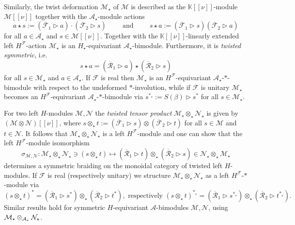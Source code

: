 \documentclass[a4paper,11pt]{article}
\begin{document}
Similarly, the twist deformation $\mathcal{M}_\star$ of $\mathcal{M}$ is described as
the $\mathbb{K}[[\nu]]$-module $\mathcal{M}[[\nu]]$ together with the $\mathcal{A}_\star$-module actions
\begin{equation}
    a\star s:=(\overline{\mathcal{F}}_1\rhd a)\cdot(\overline{\mathcal{F}}_2\rhd s)
    \hspace{1cm}\text{and}\hspace{1cm}
    s\star a:=(\overline{\mathcal{F}}_1\rhd s)(\overline{\mathcal{F}}_2\rhd a)
\end{equation}
for all $a\in\mathcal{A}_\star$ and $s\in\mathcal{M}[[\nu]]$. Together with the
$\mathbb{K}[[\nu]]$-linearly extended left $H^\mathcal{F}$-action $\mathcal{M}_\star$
is an $H_\star$-equivariant $\mathcal{A}_\star$-bimodule. Furthermore, it is
\textit{twisted symmetric}, i.e.
\begin{equation}\label{eq11}
    s\star a=(\overline{\mathcal{R}}_1\rhd a)\star(\overline{\mathcal{R}}_2\rhd s)
\end{equation}
for all $s\in\mathcal{M}_\star$ and $a\in\mathcal{A}_\star$.
If $\mathcal{F}$ is real then 
$\mathcal{M}_\star$ is an $H^\mathcal{F}$-equivariant $\mathcal{A}_\star$-$*$-bimodule
with respect to the
undeformed $*$-involution, while
if $\mathcal{F}$ is unitary $\mathcal{M}_\star$ becomes an 
$H^\mathcal{F}$-equivariant $\mathcal{A}_\star$-$*$-bimodule 
via $s^{*_\star}:=S(\beta)\rhd s^*$ for all $s\in\mathcal{M}_\star$.

For two left $H$-modules $\mathcal{M},\mathcal{N}$ the \textit{twisted tensor product}
$\mathcal{M}_\star\otimes_\star\mathcal{N}_\star$ is given by $(\mathcal{M}\otimes\mathcal{N})[[\nu]]$, where
$s\otimes_\star t:=(\overline{\mathcal{F}}_1\rhd s)
\otimes(\overline{\mathcal{F}}_2\rhd t)$ for all $s\in\mathcal{M}$ and $t\in\mathcal{N}$.
It follows that $\mathcal{M}_\star\otimes_\star\mathcal{N}_\star$ is a left $H^\mathcal{F}$-module
and one can show that the left $H^\mathcal{F}$-module isomorphism
\begin{equation}
    \sigma_{\mathcal{M},\mathcal{N}}\colon\mathcal{M}_\star\otimes_\star\mathcal{N}_\star\ni(s\otimes_\star t)\mapsto
    (\overline{\mathcal{R}}_1\rhd t)\otimes_\star(\overline{\mathcal{R}}_2\rhd s)\in \mathcal{N}_\star\otimes_\star\mathcal{M}_\star
\end{equation}
determines a symmetric braiding on the monoidal category of twisted left $H$-modules.
If $\mathcal{F}$ is real (respectively unitary) we structure
$\mathcal{M}_\star\otimes_\star\mathcal{N}_\star$ as a
left $H^\mathcal{F}$-$*$-module via
\begin{equation}
    (s\otimes_\star t)^*=(\overline{\mathcal{R}}_1\rhd s^*)\otimes_\star
    (\overline{\mathcal{R}}_2\rhd t^*),
    \text{ respectively }
    (s\otimes_\star t)^{*_\star}=(\overline{\mathcal{R}}_1\rhd s^{*_\star})\otimes_\star
    (\overline{\mathcal{R}}_2\rhd t^{*_\star}).
\end{equation}
Similar results hold for symmetric $H$-equivariant $\mathcal{A}$-bimodules $\mathcal{M},\mathcal{N}$, using
$\mathcal{M}_\star\otimes_{{\cal A}_\star}\mathcal{N}_\star$.
\end{document}
